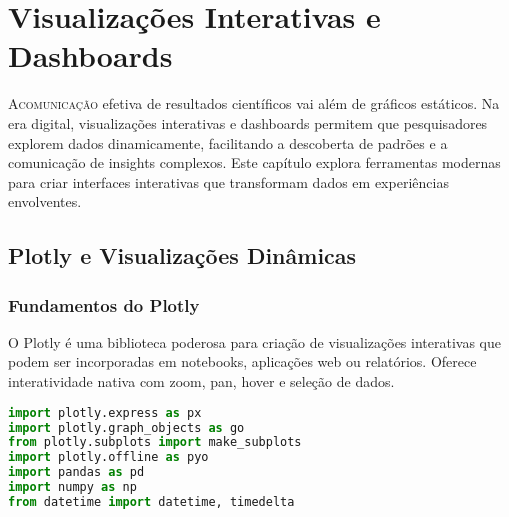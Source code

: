 
\chapter{Visualizações Interativas e Dashboards}

\lettrine{A}{comunicação} efetiva de resultados científicos vai além de gráficos estáticos. Na era digital, visualizações interativas e dashboards permitem que pesquisadores explorem dados dinamicamente, facilitando a descoberta de padrões e a comunicação de insights complexos. Este capítulo explora ferramentas modernas para criar interfaces interativas que transformam dados em experiências envolventes.

\section{Plotly e Visualizações Dinâmicas}

\subsection{Fundamentos do Plotly}

O Plotly é uma biblioteca poderosa para criação de visualizações interativas que podem ser incorporadas em notebooks, aplicações web ou relatórios. Oferece interatividade nativa com zoom, pan, hover e seleção de dados.

\begin{pythonbox}
\begin{lstlisting}[language=Python]
import plotly.express as px
import plotly.graph_objects as go
from plotly.subplots import make_subplots
import plotly.offline as pyo
import pandas as pd
import numpy as np
from datetime import datetime, timedelta
\end{lstlisting}
\end{pythonbox}

